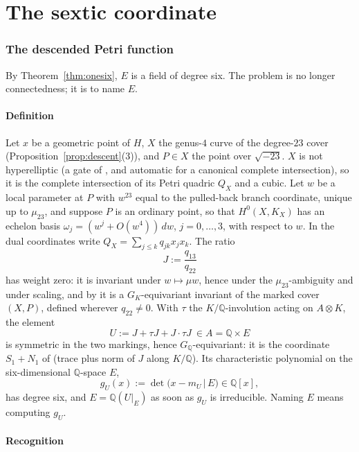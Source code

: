 \documentclass[11pt]{amsart}
\newcommand{\QQ}{\mathbb{Q}}
\newcommand{\GQ}{G_{\QQ}}
\newcommand{\sqm}{\sqrt{-23}}
\newcommand{\gU}{g_U}
\theoremstyle{plain}
\theoremstyle{definition}
\begin{document}
\part{The sextic coordinate}

\section{The descended Petri function}\label{sec:petri}

By Theorem~\ref{thm:onesix}, $E$ is a field of degree six. The problem
is no longer connectedness; it is to name $E$.

\subsection{Definition}

Let $x$ be a geometric point of $H$, $X$ the genus-$4$ curve of the
degree-$23$ cover (Proposition~\ref{prop:descent}(3)), and $P\in X$
the point over $\sqm$. $X$ is not hyperelliptic (a gate of
\cite{seven}, and automatic for a canonical complete intersection), so
it is the complete intersection of its Petri quadric $Q_X$ and a
cubic. Let $w$ be a local parameter at $P$ with $w^{23}$ equal to the
pulled-back branch coordinate, unique up to $\mu_{23}$, and suppose
$P$ is an ordinary point, so that $H^0(X,K_X)$ has an echelon basis
$\omega_j=(w^j+O(w^4))\,dw$, $j=0,\dots,3$, with respect to $w$. In
the dual coordinates write $Q_X=\sum_{j\le k}q_{jk}x_jx_k$. The ratio
\[
  J:=\frac{q_{13}}{q_{22}}
\]
has weight zero: it is invariant under $w\mapsto\mu w$, hence under
the $\mu_{23}$-ambiguity and under scaling, and by
\cite[Prop.~5.7]{seven} it is a $G_K$-equivariant invariant
of the marked cover $(X,P)$, defined wherever $q_{22}\ne0$. With
$\tau$ the $K/\QQ$-involution acting on $A\otimes K$, the element
\[
  U:=J+\tau J+J\cdot\tau J\ \in A=\QQ\times E
\]
is symmetric in the two markings, hence $\GQ$-equivariant: it is the
coordinate $S_1+N_1$ of \cite{seven} (trace plus norm of $J$ along
$K/\QQ$). Its characteristic polynomial on the six-dimensional
$\QQ$-space $E$,
\[
  \gU(x):=\det\bigl(x-m_U\,|\,E\bigr)\in\QQ[x],
\]
has degree six, and $E=\QQ(U|_E)$ as soon as $\gU$ is irreducible.
Naming $E$ means computing $\gU$.

\subsection{Recognition}
\end{document}
